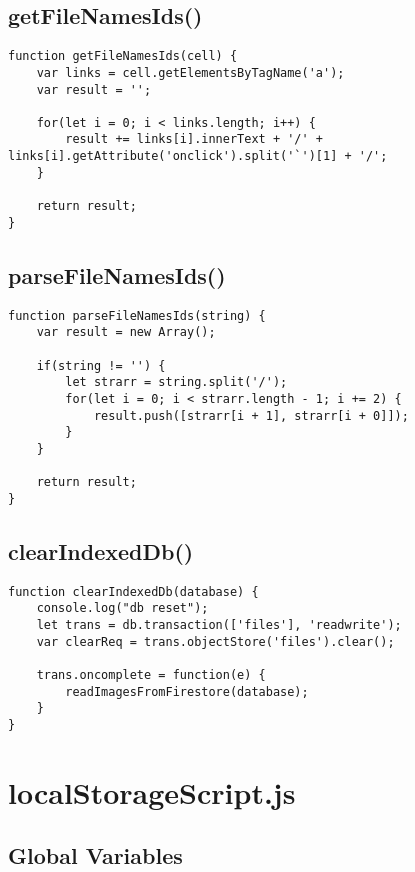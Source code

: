 \documentclass[letterpaper]{article}
\begin{document}
\subsection{getFileNamesIds()}

\begin{lstlisting}[firstnumber=59]
function getFileNamesIds(cell) {
    var links = cell.getElementsByTagName('a');
    var result = '';

    for(let i = 0; i < links.length; i++) {
        result += links[i].innerText + '/' + links[i].getAttribute('onclick').split('`')[1] + '/';
    }

    return result;
}
\end{lstlisting}

\subsection{parseFileNamesIds()}

\begin{lstlisting}[firstnumber=70]
function parseFileNamesIds(string) {
    var result = new Array();

    if(string != '') {
        let strarr = string.split('/');
        for(let i = 0; i < strarr.length - 1; i += 2) {
            result.push([strarr[i + 1], strarr[i + 0]]);
        }
    }

    return result;
}
\end{lstlisting}

\subsection{clearIndexedDb()}

\begin{lstlisting}[firstnumber=83]
function clearIndexedDb(database) {
    console.log("db reset");
    let trans = db.transaction(['files'], 'readwrite');
    var clearReq = trans.objectStore('files').clear();

    trans.oncomplete = function(e) {
        readImagesFromFirestore(database);
    }
}
\end{lstlisting}

\newpage

\section{localStorageScript.js}

\subsection{Global Variables}
\end{document}
